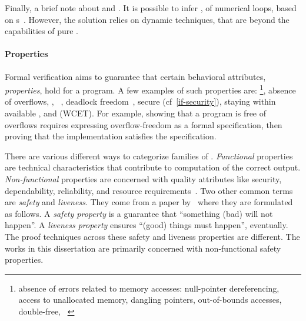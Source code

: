 Finally, a brief note about  and . It is
possible to infer , of numerical loops, based on s~\cite{nguyen2017}. However, the solution relies on dynamic
techniques, that are beyond the capabilities of pure .

\paragraph*{Properties}
Formal verification aims to guarantee that certain
behavioral attributes, \ie \emph{properties}, hold for a program. A few examples
of such properties are: \footnote{\Ie absence of errors
related to memory accesses: null-pointer dereferencing, access to unallocated
memory, dangling pointers, out-of-bounds accesses, double-free,
\etc~\cite{muller2024}}, absence of overflows, , ~\cite{georges2025}, deadlock
freedom~\cite{roscoe1987}, secure 
(cf~\autoref{if-security}), staying within available , and
 (WCET). For example, showing that a program is
free of overflows requires expressing overflow-freedom as a formal
specification, then proving that the implementation satisfies the
specification.

There are various different ways to categorize families of .
\emph{Functional} properties are technical
characteristics that contribute to computation of the correct output.
\emph{Non-functional} properties are concerned
with quality attributes like security, dependability, reliability, and resource
requirements~\cite{terbeek2018}. Two other common terms are \emph{safety} and
\emph{liveness}. They come from a paper by~\textcite{lamport1977} where they are
formulated as follows. A \emph{safety property} is a
guarantee that \enquote{something (bad) will not happen}. A \emph{liveness
property} ensures \enquote{(good) things must
happen}, eventually. The proof techniques across these safety and liveness
properties are different. The works in this dissertation are primarily concerned
with non-functional safety properties.

